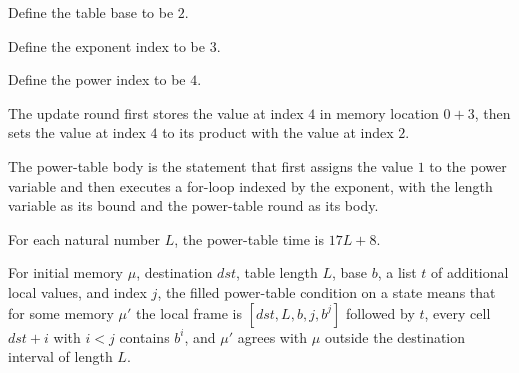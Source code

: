 \begin{definition}
\label{Light.PowTable.Base}
\leanok
{}
Define the table base to be $2$.
\end{definition}

\begin{definition}
\label{Light.PowTable.Expo}
\leanok
{}
Define the exponent index to be $3$.
\end{definition}

\begin{definition}
\label{Light.PowTable.Power}
\leanok
{}
Define the power index to be $4$.
\end{definition}

\begin{definition}
\label{Light.powTableRound}
\leanok
{}
The update round first stores the value at index $4$ in memory location $0+3$, then sets
the value at index $4$ to its product with the value at index $2$.
\end{definition}

\begin{definition}
\label{Light.powTableBody}
\leanok
{}
The power-table body is the statement that first assigns the value $1$ to the power
variable and then executes a for-loop indexed by the exponent, with the length variable
as its bound and the power-table round as its body.
\end{definition}

\begin{definition}
\label{Light.powTableTime}
\leanok
For each natural number $L$, the power-table time is $17L+8$.
\end{definition}

\begin{definition}
\label{Light.PowTable.Filled}
\leanok
{}
For initial memory $\mu$, destination $dst$, table length $L$, base $b$, a list $t$ of
additional local values, and index $j$, the filled power-table condition on a state means
that for some memory $\mu\prime$ the local frame is
$[dst,L,b,j,b^j]$ followed by $t$, every cell $dst+i$ with $i<j$ contains $b^i$, and
$\mu\prime$ agrees with $\mu$ outside the destination interval of length $L$.
\end{definition}


